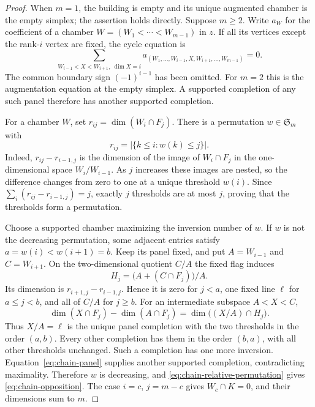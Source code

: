 \begin{proof}
When $m=1$, the building is empty and its unique augmented
chamber is the empty simplex; the assertion holds directly.
Suppose $m\geq2$. Write $a_W$ for the coefficient of a chamber
$W=(W_1<\cdots<W_{m-1})$ in $z$. If all its vertices except
the rank-$i$ vertex are fixed, the cycle equation is
\begin{equation}\label{eq:chain-panel}
 \sum_{W_{i-1}<X<W_{i+1},\ \dim X=i}
 a_{(W_1,\ldots,W_{i-1},X,W_{i+1},\ldots,W_{m-1})}=0.
\end{equation}
The common boundary sign $(-1)^{i-1}$ has been omitted.
For $m=2$ this is the augmentation equation at the empty
simplex. A supported completion of any such panel therefore
has another supported completion.

For a chamber $W$, set $r_{ij}=\dim(W_i\cap F_j)$. There is
a permutation $w\in\mathfrak S_m$ with
\begin{equation}\label{eq:chain-relative-permutation}
 r_{ij}=|\{k\leq i:w(k)\leq j\}|.
\end{equation}
Indeed, $r_{ij}-r_{i-1,j}$ is the dimension of the image of
$W_i\cap F_j$ in the one-dimensional space $W_i/W_{i-1}$.
As $j$ increases these images are nested, so the difference
changes from zero to one at a unique threshold $w(i)$.
Since $\sum_i(r_{ij}-r_{i-1,j})=j$, exactly $j$ thresholds
are at most $j$, proving that the thresholds form a permutation.

Choose a supported chamber maximizing the inversion number
of $w$. If $w$ is not the decreasing permutation, some
adjacent entries satisfy $a=w(i)<w(i+1)=b$. Keep its panel
fixed, and put $A=W_{i-1}$ and $C=W_{i+1}$. On the
two-dimensional quotient $C/A$ the fixed flag induces
\[
 H_j=\bigl(A+(C\cap F_j)\bigr)/A.
\]
Its dimension is $r_{i+1,j}-r_{i-1,j}$. Hence it is zero
for $j<a$, one fixed line $\ell$ for $a\leq j<b$, and
all of $C/A$ for $j\geq b$. For an intermediate subspace
$A<X<C$,
\[
 \dim(X\cap F_j)-\dim(A\cap F_j)
       =\dim\bigl((X/A)\cap H_j\bigr).
\]
Thus $X/A=\ell$ is the unique panel completion with the
two thresholds in the order $(a,b)$. Every other completion
has them in the order $(b,a)$, with all other thresholds
unchanged. Such a completion has one more inversion.
Equation~\eqref{eq:chain-panel} supplies another supported
completion, contradicting maximality. Therefore $w$ is
decreasing, and \eqref{eq:chain-relative-permutation} gives
\eqref{eq:chain-opposition}. The case $i=c$, $j=m-c$ gives
$W_c\cap K=0$, and their dimensions sum to $m$.
\end{proof}

